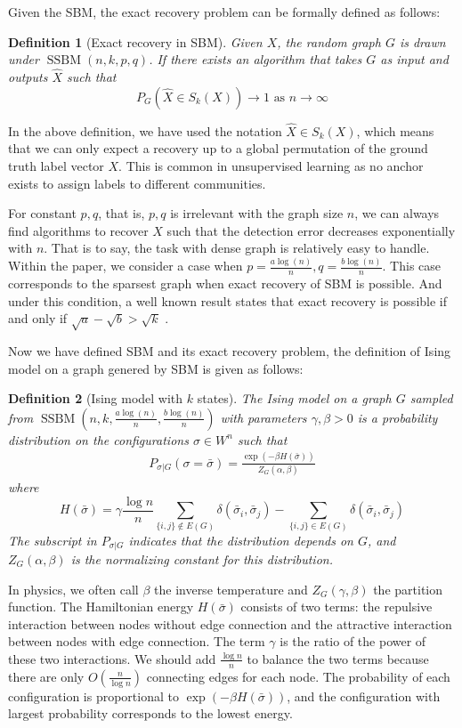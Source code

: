 \documentclass[journal]{IEEEtran}
\newtheorem{definition}{Definition}
\newcommand{\A}{\frac{a \log(n)}{n}}
\newcommand{\B}{\frac{b \log(n)}{n}}
\DeclareMathOperator{\SSBM}{SSBM}
\begin{document}
Given the SBM, the exact recovery problem can be formally defined as follows:
\begin{definition}[Exact recovery in SBM] \label{def:SSBMR}
Given $X$, the random graph $G$ is drawn under $\SSBM(n,k,p,q)$. If there exists an algorithm that takes
$G$ as input and outputs $\hat{X}$ such that
\begin{equation*}
P_G(\hat{X} \in S_k(X)) \to 1 \textrm{ as } n \to \infty
\end{equation*}
\end{definition}

In the above definition, we have used the notation $\hat{X} \in S_k(X)$, which means that we can only
expect a recovery up to a global permutation of the ground truth label vector $X$. This is common in unsupervised
learning as no anchor exists to assign labels to different communities.

For constant $p,q$, that is, $p,q$ is irrelevant with the graph size $n$,
we can always find algorithms to recover $X$ such that the detection error decreases exponentially with $n$.
That is to say, the task with dense graph is relatively easy to handle. Within the paper, we consider a case
when $p = \A, q = \B$. This case corresponds to the sparsest graph when exact recovery of SBM is possible.
And under this condition, a well known result states that
exact recovery is possible if and only if $\sqrt{a} - \sqrt{b} > \sqrt{k}$ \cite{abbe2015community}.

Now we have defined SBM and its exact recovery problem, the definition of Ising model on a graph genered by SBM is given
as follows:
\begin{definition}[Ising model with $k$ states]\label{def:ising}
	The Ising model on a graph $G$ sampled from $\SSBM(n,k,\A,\B)$ with parameters $\gamma,\beta>0$ is a probability distribution on the configurations $\sigma\in W^n$ such that
	\begin{align} \label{eq:isingma}
	P_{\sigma|G}(\sigma=\bar{\sigma})=\frac{\exp(-\beta H(\bar{\sigma}))}{Z_G(\alpha,\beta)}
	\end{align}
	where
	\begin{equation}
	H(\bar{\sigma}) = \gamma \frac{\log n}{n} \sum_{\{i,j\}\not\in E(G)} \delta(\bar{\sigma}_i, \bar{\sigma}_j)
	- \sum_{\{i,j\}\in E(G)} \delta(\bar{\sigma}_i, \bar{\sigma}_j)
	\end{equation}	
	The subscript in $P_{\sigma|G}$ indicates that the distribution depends on $G$, and
	$Z_G(\alpha,\beta)$ is the normalizing constant for this distribution.
\end{definition}
In physics, we often call $\beta$ the inverse temperature and $Z_G(\gamma, \beta)$ the partition function.
The Hamiltonian energy $H(\bar{\sigma})$ consists of two terms: the repulsive interaction between nodes without edge connection
and the attractive interaction between nodes with edge connection. The term $\gamma$ is the ratio of the power of these two
interactions. We should add $\frac{\log n}{n}$ to balance the two terms because there are only $O(\frac{n}{\log n})$
connecting edges for each node.
The probability of each configuration is proportional to $\exp(-\beta H(\bar{\sigma}))$, and the configuration with largest
probability corresponds to the lowest energy.
\end{document}
